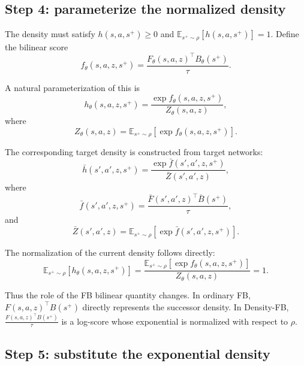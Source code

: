 \documentclass[11pt]{article}
\begin{document}
\subsection*{Step 4: parameterize the normalized density}

The density must satisfy $h(s,a,s^+)\geq 0$ and $\mathbb E_{s^+\sim\rho} [h(s,a,s^+)] = 1.$
Define the bilinear score
\begin{equation}
f_\theta(s,a,z,s^+) = \frac{ F_\theta(s,a,z)^\top B_\theta(s^+) }{\tau}.
\label{eq:score}
\end{equation}

A natural parameterization of this is
\begin{equation}
    \boxed{ h_\theta(s,a,z,s^+) = \frac{ \exp f_\theta(s,a,z,s^+) }{ Z_\theta(s,a,z) }, }
\label{eq:h-exponential}
\end{equation}
where
\begin{equation}
Z_\theta(s,a,z) = \mathbb E_{s^+\sim\rho} \left[ \exp f_\theta(s,a,z,s^+) \right].
\label{eq:partition}
\end{equation}

The corresponding target density is constructed from target networks:
\begin{equation}
    \boxed{ \bar h(s',a',z,s^+) = \frac{ \exp \bar f(s',a',z,s^+) }{ \bar Z(s',a',z) }, }
\end{equation}
where
\begin{equation}
    \bar f(s',a',z,s^+) = \frac{ \bar F(s',a',z)^\top \bar B(s^+) }{\tau},
\end{equation}
and
\begin{equation}
    \bar Z(s',a',z) = \mathbb E_{s^+\sim\rho} \left[ \exp \bar f(s',a',z,s^+) \right].
\end{equation}

The normalization of the current density follows directly:
\begin{equation}
\mathbb E_{s^+\sim\rho} [h_\theta(s,a,z,s^+)]   = \frac{ \mathbb E_{s^+\sim\rho} [\exp f_\theta(s,a,z,s^+)] }{ Z_\theta(s,a,z) }
                                                = 1.
\end{equation}

Thus the role of the FB bilinear quantity changes.
In ordinary FB, $F(s,a,z)^\top B(s^+)$ directly represents the successor density.
In Density-FB, $\frac{F(s,a,z)^\top B(s^+)}{\tau}$ is a log-score whose exponential is normalized with respect to $\rho$.

\subsection*{Step 5: substitute the exponential density}
\end{document}
